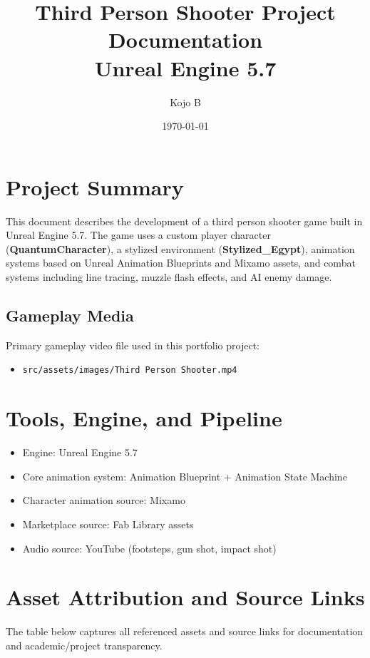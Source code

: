 \documentclass[12pt]{article}
\title{Third Person Shooter Project Documentation \\
\large Unreal Engine 5.7}
\author{Kojo B}
\date{\today}
\begin{document}
\maketitle
\tableofcontents
\newpage

\section{Project Summary}
This document describes the development of a third person shooter game built in Unreal Engine 5.7. The game uses a custom player character (\textbf{QuantumCharacter}), a stylized environment (\textbf{Stylized\_Egypt}), animation systems based on Unreal Animation Blueprints and Mixamo assets, and combat systems including line tracing, muzzle flash effects, and AI enemy damage.

\subsection{Gameplay Media}
Primary gameplay video file used in this portfolio project:
\begin{itemize}[leftmargin=*]
  \item \texttt{src/assets/images/Third Person Shooter.mp4}
\end{itemize}

\section{Tools, Engine, and Pipeline}
\begin{itemize}[leftmargin=*]
  \item Engine: Unreal Engine 5.7
  \item Core animation system: Animation Blueprint + Animation State Machine
  \item Character animation source: Mixamo
  \item Marketplace source: Fab Library assets
  \item Audio source: YouTube (footsteps, gun shot, impact shot)
\end{itemize}

\section{Asset Attribution and Source Links}
The table below captures all referenced assets and source links for documentation and academic/project transparency.
\end{document}
